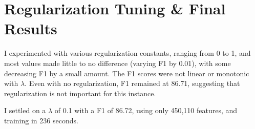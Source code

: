 \documentclass[11pt]{article}
\begin{document}
\section{Regularization Tuning \& Final Results}

I experimented with various regularization constants, ranging from 0 to 1, and most values
made little to no difference (varying F1 by 0.01), with some decreasing F1 by a small amount. 
The F1 scores were not linear or monotonic with $\lambda$. 
Even with no regularization, F1 remained at 86.71, suggesting that regularization is not important
for this instance.

I settled on a $\lambda$ of 0.1 with a F1 of 86.72, using only 450,110 features, and training in
236 seconds.
\end{document}

